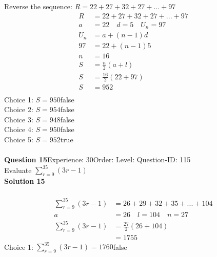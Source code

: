 \documentclass{article}
\begin{document}
Reverse the sequence: $R=22+27+32+27+...+97$
\begin{align*}
R&=22+27+32+27+...+97\\[2pt]
a&=22\quad d=5 \quad U_n=97\\[2pt]
U_n&=a+(n-1)d\\[2pt]
97&=22+(n-1)5\\[2pt]
n&=16\\[12pt]
S&=\displaystyle\frac{n}{2}(a+l)\\[2pt]
S&=\displaystyle\frac{16}{2}(22+97)\\[2pt]
S&=952\\
\end{align*}
Choice 1: \hspace{20pt}$S=950$\hspace{20pt}false\\
Choice 2: \hspace{20pt}$S=954$\hspace{20pt}false\\
Choice 3: \hspace{20pt}$S=948$\hspace{20pt}false\\
Choice 4: \hspace{20pt}$S=950$\hspace{20pt}false\\
Choice 5: \hspace{20pt}$S=952$\hspace{20pt}true\\
\\[4pt]
\noindent\textbf{Question 15}\hspace{20pt}Experience: 30\hspace{20pt}Order: \hspace{20pt}Level: \hspace{20pt}Question-ID: 115\\[2pt]
Evaluate $\displaystyle\sum_{r=9}^{35} (3r-1)$\\[4pt]
\noindent\textbf{Solution 15}\\[2pt]
\\[-35pt]\begin{align*}
\displaystyle\sum_{r=9}^{35} (3r-1)&=26+29+32+35+...+104\\[2pt]
a&=26\quad l=104 \quad n=27\\[2pt]
\displaystyle\sum_{r=9}^{35} (3r-1)&=\displaystyle\frac{27}{2}(26+104)\\[2pt]
&=1755
\end{align*}
Choice 1: \hspace{20pt}$\displaystyle\sum_{r=9}^{35} (3r-1)=1760$\hspace{20pt}false\\
\end{document}
